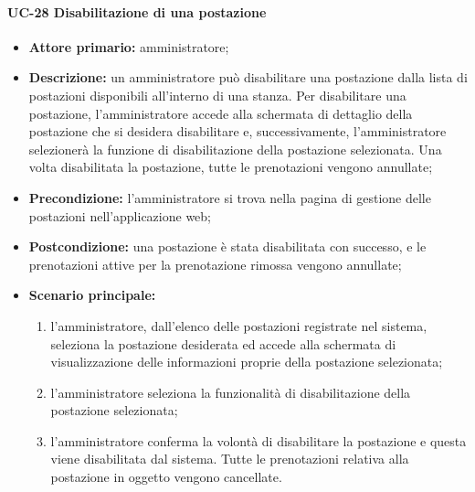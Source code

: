 \paragraph{UC-28 Disabilitazione di una postazione}
\begin{itemize}
    \item \textbf{Attore primario:} amministratore;
    \item \textbf{Descrizione:} un amministratore pu\`{o} disabilitare una postazione dalla lista di postazioni disponibili all'interno di una stanza. Per disabilitare una postazione, l'amministratore accede alla schermata di dettaglio della postazione che si desidera disabilitare e, successivamente, l'amministratore selezionerà la funzione di disabilitazione della postazione selezionata. Una volta disabilitata la postazione, tutte le prenotazioni vengono annullate;
    \item \textbf{Precondizione:} l'amministratore si trova nella pagina di gestione delle postazioni nell'applicazione web;
    \item \textbf{Postcondizione:} una postazione \`{e} stata disabilitata con successo, e le prenotazioni attive per la prenotazione rimossa vengono annullate;
    \item \textbf{Scenario principale:}
    \begin{enumerate}
        \item l'amministratore, dall'elenco delle postazioni registrate nel sistema, seleziona la postazione desiderata ed accede alla schermata di visualizzazione delle informazioni proprie della postazione selezionata;
        \item l'amministratore seleziona la funzionalità di disabilitazione della postazione selezionata;
        \item l'amministratore conferma la volontà di disabilitare la postazione e questa viene disabilitata dal sistema. Tutte le prenotazioni relativa alla postazione in oggetto vengono cancellate.
    \end{enumerate}
\end{itemize}

